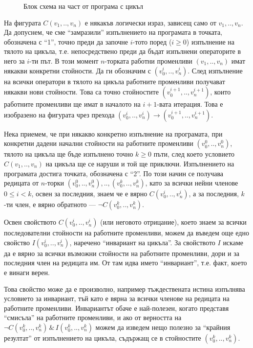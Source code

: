 {\begin{figure}
  \caption{Блок схема на част от програма с  цикъл}
  \label{fig:1while}
\end{figure}


\begin{mdframed}[hidealllines=true,backgroundcolor=gray!20]
На фигурата $C(v_1,..,v_n)$ е някакъв логически израз, зависещ само от $v_1,..,v_n$. Да допуснем, че сме ``замразили'' изпълнението на програмата в точката, обозначена с ``1'', точно преди да започне $i$-тото поред ($i\geq 0$) изпълнение на тялото на цикъла, т.е. непосредствено преди да бъдат изпълнени операторите в него за $i$-ти път. В този момент $n$-торката работни променливи $(v_1,..,v_n)$ имат някакви конкретни стойности. Да ги обозначим с $(v_0^{i},..,v_n^{i})$. След изпълнение на всички оператори в тялото на цикъла работните променливи получават някакви нови стойности. Това са точно стойностите $(v_0^{i+1},..,v_n^{i+1})$, които работните променливи ще имат в началото на $i+1$-вата итерация. Това е изобразено на фигурата чрез прехода $(v_0^i,..,v_n^i) \rightarrow (v_0^{i+1},..,v_n^{i+1})$.

Нека приемем, че при някакво конкретно изпълнение на програмата, при конкретни дадени начални стойности на работните променливи  $(v_0^{0},..,v_n^{0})$, тялото на цикъла ще бъде изпълнено точно  $k\geq 0$ пъти, след което условието $C(v_1,..,v_n)$ на цикъла ще се наруши и той ще приключи. Изпълнението на програмата достига точката, обозначена с ``2''. По този начин се получава редицата от $n$-торки $(v_0^{0},..,v_n^{0}),..,(v_0^{k},..,v_n^{k})$, като за всички нейни членове $0\leq i < k$, освен за последния, знаем че е вярно $C(v_0^{i},..,v_n^{i})$, а за последния, $k$-ти член, е вярно обратното --- $\neg C(v_0^{k},..,v_n^{k})$.

Освен свойството $C(v_0^{i},..,v_n^{i})$ (или неговото отрицание), което знаем за всички последователни стойности на работните променливи, можем да въведем още едно свойство $I(v_0^{i},..,v_n^{i})$, наречено ``инвариант на цикъла''. За свойството $I$ искаме да е вярно за всички възможни стойности на работните променливи, дори и за последния член на редицата им. От там идва името ``инвариант'', т.е. факт, което е винаги верен.

Това свойство може да е произволно, например тъждествената истина  изпълнява условието за инвариант, тъй като е вярна за всички членове на редицата на работните променливи. Инвариантът обаче е най-полезен, когато представя ``смисъла'' на работните променливи, и ако от верността на $\neg C(v_0^{k},..,v_n^{k})\,\&\, I(v_0^{k},..,v_n^{k})$ можем да изведем нещо полезно за ``крайния резултат'' от изпълнението на цикъла, съдържащ се в стойностите $(v_0^{k},..,v_n^{k})$.
\end{mdframed}

}
